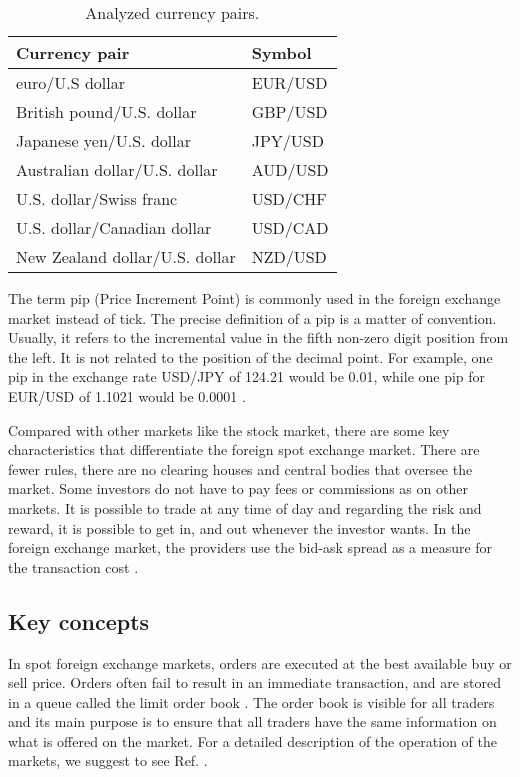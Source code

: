 \begin{table}[htbp]
\centering
\begin{threeparttable}
\caption{Analyzed currency pairs.}
\begin{tabular*}{\columnwidth}{P{5cm}P{3cm}}
\toprule
\bf{Currency pair} & \bf{Symbol} \tabularnewline
\midrule
euro/U.S dollar& EUR/USD \tabularnewline
British pound/U.S. dollar& GBP/USD \tabularnewline
Japanese yen/U.S. dollar& JPY/USD \tabularnewline
Australian dollar/U.S. dollar& AUD/USD \tabularnewline
U.S. dollar/Swiss franc& USD/CHF \tabularnewline
U.S. dollar/Canadian dollar& USD/CAD \tabularnewline
New Zealand dollar/U.S. dollar& NZD/USD \tabularnewline
\bottomrule
\end{tabular*}
\label{tab:majors}
\end{threeparttable}
\end{table}

The term pip (Price Increment Point) is commonly used in the foreign exchange
market instead of tick. The precise definition of a pip is a matter of
convention. Usually, it refers to the incremental value in the fifth non-zero
digit position from the left. It is not related to the position of the decimal
point. For example, one pip in the exchange rate USD/JPY of 124.21 would be
0.01, while one pip for EUR/USD of 1.1021 would be 0.0001
\cite{forex_structure,micro_eff,forex_market_micro,book_forex_3,order_flow_forex}.

Compared with other markets like the stock market, there are some key
characteristics that differentiate the foreign spot exchange market.
There are fewer rules, there are no clearing houses and central
bodies that oversee the market. Some investors do not have to pay fees or
commissions as on other markets. It is possible to trade at any time of day and
regarding the risk and reward, it is possible to get in, and out whenever the
investor wants. In the foreign exchange market, the providers use the bid-ask
spread as a measure for the transaction cost \cite{book_forex_2}.

\subsection{Key concepts}\label{subsec:key_concepts}

In spot foreign exchange markets, orders are executed at the best available buy
or sell price. Orders often fail to result in an immediate transaction, and are
stored in a queue called the limit order book
\cite{forex_structure,forex_market_micro,stat_prop,predictive_pow,intro_market_micro,prop_order_book}.
The order book is visible for all traders and its main purpose is to ensure
that all traders have the same information on what is offered on the market.
For a detailed description of the operation of the markets, we suggest to see
Ref. \cite{my_paper_response_financial}.

